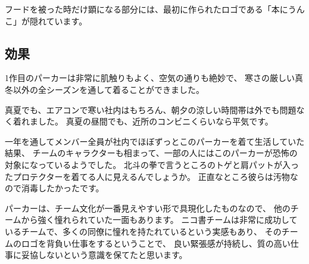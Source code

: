 フードを被った時だけ顕になる部分には、最初に作られたロゴである「本にうんこ」が隠れています。

\subsection{効果}

1作目のパーカーは非常に肌触りもよく、空気の通りも絶妙で、
寒さの厳しい真冬以外の全シーズンを通して着ることができました。

真夏でも、エアコンで寒い社内はもちろん、朝夕の涼しい時間帯は外でも問題なく着れました。
真夏の昼間でも、近所のコンビニくらいなら平気です。

一年を通してメンバー全員が社内でほぼずっとこのパーカーを着て生活していた結果、
チームのキャラクターも相まって、一部の人にはこのパーカーが恐怖の対象になっているようでした。
北斗の拳で言うところのトゲと肩パットが入ったプロテクターを着てる人に見えるんでしょうか。
正直なところ彼らは汚物なので消毒したかったです。

パーカーは、チーム文化が一番見えやすい形で具現化したものなので、
他のチームから強く憧れられていた一面もあります。
ニコ書チームは非常に成功しているチームで、多くの同僚に憧れを持たれているという実感もあり、
そのチームのロゴを背負い仕事をするということで、
良い緊張感が持続し、質の高い仕事に妥協しないという意識を保てたと思います。
